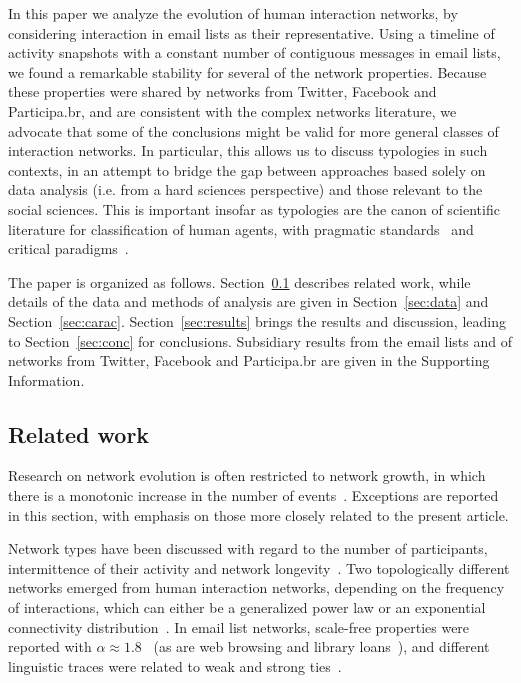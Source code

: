 \documentclass[%
	aip,
	jmp,%
	amsmath,amssymb,
	reprint,%
]{revtex4-1}
\begin{document}
In this paper we analyze the evolution of human interaction networks, by considering interaction in email lists as their representative. Using a timeline of activity snapshots with a constant number of contiguous messages in email lists, we found a remarkable stability for several of the network properties. Because these properties were shared by networks from Twitter, Facebook and Participa.br, and are consistent with the complex networks literature, we advocate that some of the conclusions might be valid for more general classes of interaction networks. In particular, this allows us to discuss typologies in such contexts, in an attempt to bridge the gap between approaches based solely on data analysis (i.e. from a hard sciences perspective) and those relevant to the social sciences. This is important insofar as typologies are the canon of scientific literature for classification of human agents, with pragmatic standards~\cite{myers} and critical paradigms~\cite{adorno,typCanon}. 

The paper is organized as follows. Section~\ref{sec:related} describes related work, while details of the data and methods of analysis are given in  Section~\ref{sec:data} and Section~\ref{sec:carac}. Section~\ref{sec:results} brings the results and discussion, leading to Section~\ref{sec:conc} for conclusions.
Subsidiary results from the email lists and of networks from Twitter, Facebook and Participa.br are given in the Supporting Information.

\subsection{Related work}\label{sec:related}
Research on network evolution is often restricted to network growth, in which there is a monotonic increase in the number of events~\cite{barabasiEvo}. Exceptions are reported in this section, with emphasis on those more closely related to the present article.

Network types have been discussed with regard to the number of participants, intermittence of their activity and network longevity~\cite{barabasiEvo}. Two topologically different networks emerged from human interaction networks, depending on the frequency of interactions, which can either be a generalized power law or an exponential connectivity distribution~\cite{barabasiTopologicalEv}. In email list networks, scale-free properties were reported with $\alpha \approx 1.8$~\cite{bird} (as are web browsing and library loans~\cite{barabasiHumanDyn}), and different linguistic traces were related to weak and strong ties~\cite{GMANE2}.
\end{document}
